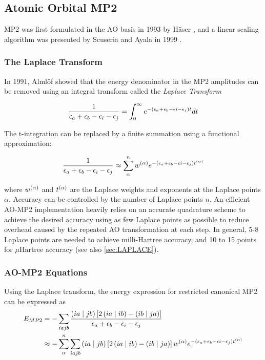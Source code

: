 \subsection{Atomic Orbital MP2}

MP2 was first formulated in the AO basis in 1993 by Häser \cite{Has1993}, and a linear scaling algorithm was presented by Scuseria and Ayala in 1999 \cite{Scu1999}. 

\subsubsection{The Laplace Transform}

In 1991, Almlöf showed \cite{Alm1991} that the energy denominator in the MP2 amplitudes can be removed using an integral transform called the \emph{Laplace Transform}

\begin{equation}
\frac{1}{\epsilon_a + \epsilon_b - \epsilon_i - \epsilon_j} = \int_0^{\infty} e^{-\left(\epsilon_a + \epsilon_b - \epsilon i - \epsilon_j\right)t} dt
\end{equation}

The t-integration can be replaced \cite{Has1993} by a finite summation using a functional approximation:

\begin{equation}
\frac{1}{\epsilon_a + \epsilon_b - \epsilon_i - \epsilon_j} \approx \sum_{\alpha}^{n} w^{(\alpha)} e^{-\left(\epsilon_a + \epsilon_b - \epsilon i - \epsilon_j\right)t^{(\alpha)}}
\end{equation} 

\noindent where $w^{(\alpha)}$ and $t^{(\alpha)}$ are the Laplace weights and exponents at the Laplace points $\alpha$. Accuracy can be controlled by the number of Laplace points $n$. An efficient AO-MP2 implementation heavily relies on an accurate quadrature scheme to achieve the desired accuracy using as few Laplace points as possible to reduce overhead caused by the repeated AO transformation at each step. In general, 5-8 Laplace points are needed to achieve milli-Hartree accuracy, and 10 to 15 points for $\mu$Hartree accuracy (see also \ref{sec:LAPLACE}).

\subsubsection{AO-MP2 Equations}

Using the Laplace transform, the energy expression for restricted canonical MP2 can be expressed as
\begin{equation}
\begin{split}
E_{MP2} &= - \sum_{iajb} \frac{\left( ia \mid jb \right) \left[2 \left( ia \mid ib \right) - \left( ib \mid ja \right) \right]}{\epsilon_a + \epsilon_b - \epsilon_i - \epsilon_j} \\
&\approx - \sum_{\alpha}^n \sum_{iajb} \left( ia \mid jb \right) \left[2 \left( ia \mid ib \right) - \left( ib \mid ja \right) \right] w^{(\alpha)} e^{-\left(\epsilon_a + \epsilon_b - \epsilon i - \epsilon_j\right)t^{(\alpha)}}
\end{split}
\end{equation}

